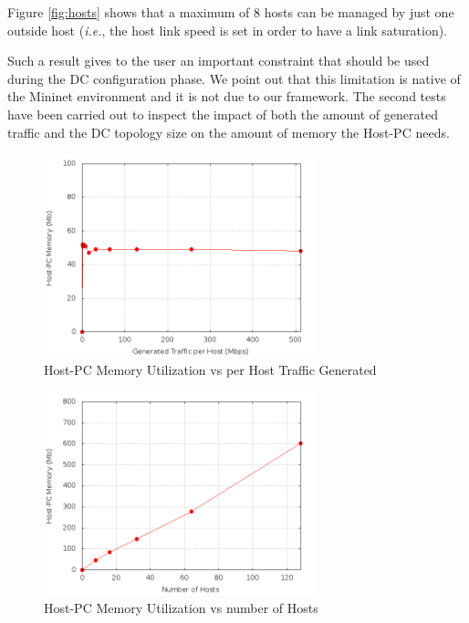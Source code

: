 \documentclass[12pt,english,oneside]{book}
\begin{document}
Figure \ref{fig:hosts} shows that a maximum of $8$ hosts can be managed by just one outside host (\textit{i.e.}, the host link speed is set in order to have a link saturation).

Such a result gives to the user an important constraint that should be used during the DC configuration phase.
We point out that this limitation is native of the Mininet environment and it is not due to our framework.
The second tests have been carried out to inspect the impact of both the amount of generated traffic and the DC topology size on the amount of memory the Host-PC needs.

\newpage

\begin{figure}[h!tbp]
        \centering
        \includegraphics[width=0.7\textwidth]{figures/mem1_utilization.png}
        \caption{Host-PC Memory Utilization vs per Host Traffic Generated}
        \label{fig:mem1}
\end{figure}

\begin{figure}[h!tbp]
        \centering
        \includegraphics[width=0.7\textwidth]{figures/mem2_utilization.png}
        \caption{Host-PC Memory Utilization vs number of Hosts}
        \label{fig:mem2}
\end{figure}
\end{document}
